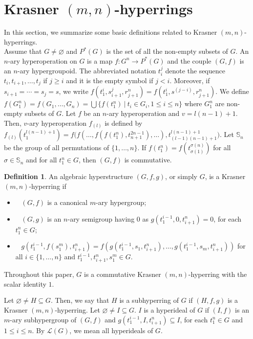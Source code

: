 \documentclass[preprint,review,10pt]{amsart}
\theoremstyle{definition}
\newtheorem{definition}[theorem]{Definition}
\theoremstyle{remark}
\numberwithin{equation}{section}
\begin{document}
\section{Krasner $(m,n)$-hyperrings}
In this section, we summarize some basic definitions  related to Krasner $(m,n)$-hyperrings. \\
Assume that $G \neq \varnothing$  and $P^*(G)$ is the
set of all the non-empty subsets of $G$.  An $n$-ary hyperoperation on $G$ is a map  $f : G^n \longrightarrow P^*(G)$
 and the couple  $(G, f)$ is  an $n$-ary hypergroupoid. The abbreviated  notation $t_i^j$   denote  the sequence $t_i, t_{i+1},\ldots, t_j$ if $j \geq i$ and it is the empty symbol if $j < i$. Moreover, if $s_{i+1} =\cdots = s_j = s$, we write $f(t^i_1, s^j_{i+1}, r^n_{j+1})=f(t^i_1, s^{(j-i)}, r^n_{j+1})$.
 We define
$f(G^n_1) = f(G_1,\ldots, G_n) = \bigcup \{f(t^n_1) \ \vert \  t_i \in  G_i, 1 \leq i \leq  n \}$ where $G_1^n$   are non-empty subsets of $G$. 
Let $f$ be an $n$-ary hyperoperation and $v = l(n- 1) + 1$. Then, $v$-ary hyperoperation $f_{(l)}$ is defined by
$f_{(l)}(t_1^{l(n-1)+1}) = f\bigg(f(\ldots, f(f(t^n _1), t_{n+1}^{2n -1}),\ldots), t_{(l-1)(n-1)+1}^{l(n-1)+1}\bigg).$ Let $\mathbb{S}_n$ be the group of all permutations of $\{1, \ldots, n\}$. If $f(t_1^n) = f(t_{\sigma(1)}^{\sigma(n)})$ for all $ \sigma \in \mathbb{S}_n$ and for all $t_1^n \in G$, then $(G,f)$ is commutative.

\begin{definition}
\cite{d1} An algebraic hyperstructure $(G, f, g)$, or simply $G$, is   a Krasner $(m, n)$-hyperring if  
\begin{itemize}
\item[\rm(1)]~ $(G, f)$ is a canonical $m$-ary hypergroup;
\item[\rm(2)]~ $(G, g)$ is an $n$-ary semigroup having $0$ as $g(t_1^{i-1},0,t_{i+1}^n) = 0$, for each $t^n_ 1 \in G$;
\item[\rm(3)]~ $g(t^{i-1}_1, f(s^m _1 ), t^n _{i+1}) = f(g(t^{i-1}_1, s_1, t^n_{ i+1}),\ldots, g(t^{i-1}_1, s_m, t^n_{ i+1}))$ for all $i \in \{1,\ldots,n\}$ and $t^{i-1}_1 , t^n_{ i+1}, s^m_ 1 \in G$. 
\end{itemize}
\end{definition}
Throughout this paper,  $G$ is a commutative Krasner $(m,n)$-hyperring with the scalar identity $1$.

Let $\varnothing \neq H \subseteq G$. Then, we say that $H$ is a subhyperring of $G$ if $(H, f, g)$ is a Krasner $(m, n)$-hyperring. Let $\varnothing \neq I \subseteq G$.  $I$  is a hyperideal  of $G$ if $(I, f)$ is an $m$-ary subhypergroup
of $(G, f)$ and $g(t^{i-1}_1, I, t_{i+1}^n) \subseteq I$, for each $t^n _1 \in  G$ and  $1 \leq i \leq n$. By  $\mathcal{L}(G)$, we mean all hyperideals of $G$.
\end{document}
